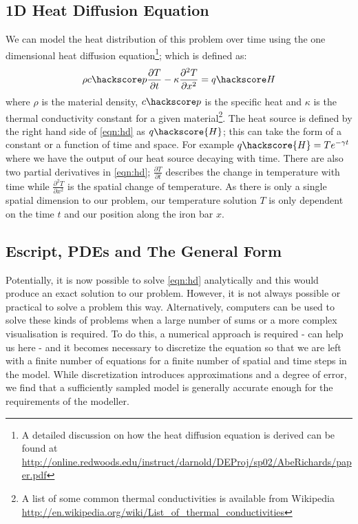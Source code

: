 \subsection{1D Heat Diffusion Equation}
We can model the heat distribution of this problem over time using the one dimensional heat diffusion equation\footnote{A detailed discussion on how the heat diffusion equation is derived can be found at \url{http://online.redwoods.edu/instruct/darnold/DEProj/sp02/AbeRichards/paper.pdf}};
which is defined as:
\begin{equation}
\rho c\hackscore p \frac{\partial T}{\partial t} - \kappa \frac{\partial^{2} T}{\partial x^{2}} = q\hackscore H 
\label{eqn:hd}
\end{equation}
where $\rho$ is the material density, $c\hackscore p$ is the specific heat and $\kappa$ is the thermal conductivity constant for a given material\footnote{A list of some common thermal conductivities is available from Wikipedia \url{http://en.wikipedia.org/wiki/List_of_thermal_conductivities}}. 
The heat source is defined by the right hand side of \ref{eqn:hd} as $q\hackscore{H}$; this can take the form of a constant or a function of time and space. For example $q\hackscore{H} = Te^{-\gamma t}$ where we have the output of our heat source decaying with time. There are also two partial derivatives in \ref{eqn:hd}; $\frac{\partial T}{\partial t}$ describes the change in temperature with time while $\frac{\partial ^2 T}{\partial x^2}$ is the spatial change of temperature. As there is only a single spatial dimension to our problem, our temperature solution $T$ is only dependent on the time $t$ and our position along the iron bar $x$.

\subsection{Escript, PDEs and The General Form}
Potentially, it is now possible to solve \ref{eqn:hd} analytically and this would produce an exact solution to our problem. However, it is not always possible or practical to solve a problem this way. Alternatively, computers can be used to solve these kinds of problems when a large number of sums or a more complex visualisation is required. To do this, a numerical approach is required - \esc can help us here -  and it becomes necessary to discretize the equation so that we are left with a finite number of equations for a finite number of spatial and time steps in the model. While discretization introduces approximations and a degree of error, we find that a sufficiently sampled model is generally accurate enough for the requirements of the modeller.

